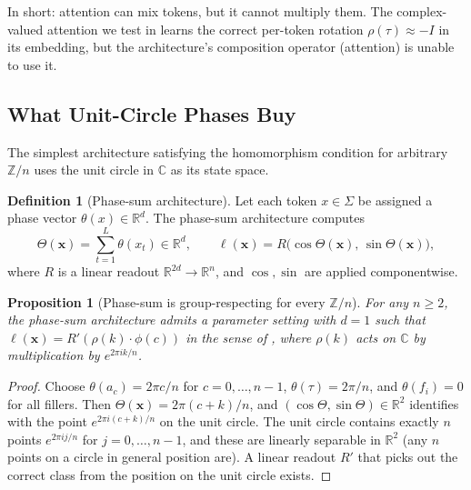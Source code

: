 \documentclass[11pt]{article}
\newtheorem{proposition}[theorem]{Proposition}
\theoremstyle{definition}
\newtheorem{definition}[theorem]{Definition}
\newcommand{\R}{\mathbb{R}}
\newcommand{\C}{\mathbb{C}}
\newcommand{\Z}{\mathbb{Z}}
\begin{document}
In short: attention can mix tokens, but it cannot multiply them.
The complex-valued attention we test in  learns
the correct per-token rotation $\rho(\tau) \approx -I$ in its
embedding, but the architecture's composition operator
(attention) is unable to use it.

\subsection{What Unit-Circle Phases Buy}
\label{subsec:unit-circle}

The simplest architecture satisfying the homomorphism condition
 for arbitrary $\Z/n$ uses the unit
circle in $\C$ as its state space.

\begin{definition}[Phase-sum architecture]
\label{def:phasesum}
Let each token $x \in \Sigma$ be assigned a phase vector
$\theta(x) \in \R^d$. The phase-sum architecture computes
\begin{equation}
\Theta(\mathbf{x}) = \sum_{t=1}^{L} \theta(x_t) \in \R^d,
\qquad
\ell(\mathbf{x}) = R\bigl( \cos\Theta(\mathbf{x}),\, \sin\Theta(\mathbf{x}) \bigr),
\end{equation}
where $R$ is a linear readout $\R^{2d} \to \R^n$, and $\cos,\sin$
are applied componentwise.
\end{definition}

\begin{proposition}[Phase-sum is group-respecting for every $\Z/n$]
\label{prop:phasesum-respects}
For any $n \geq 2$, the phase-sum architecture admits a parameter
setting with $d=1$ such that
$\ell(\mathbf{x}) = R'(\rho(k) \cdot \phi(c))$ in the sense of
, where $\rho(k)$ acts on $\C$ by
multiplication by $e^{2\pi i k / n}$.
\end{proposition}

\begin{proof}
Choose $\theta(a_c) = 2\pi c / n$ for $c = 0, \ldots, n-1$,
$\theta(\tau) = 2\pi / n$, and $\theta(f_i) = 0$ for all fillers.
Then $\Theta(\mathbf{x}) = 2\pi(c+k)/n$, and $(\cos\Theta, \sin\Theta)
\in \R^2$ identifies with the point $e^{2\pi i (c+k)/n}$ on the
unit circle. The unit circle contains exactly $n$ points
$e^{2\pi i j/n}$ for $j = 0, \ldots, n-1$, and these are linearly
separable in $\R^2$ (any $n$ points on a circle in general position
are). A linear readout $R'$ that picks out the correct class from
the position on the unit circle exists.
\end{proof}
\end{document}
